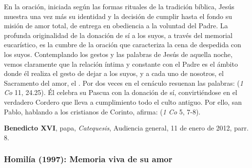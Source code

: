 \begin{patercite}
En la oración, iniciada según las formas rituales de la tradición bíblica, Jesús muestra una vez más su identidad y la decisión de cumplir hasta el fondo su misión de amor total, de entrega en obediencia a la voluntad del Padre. La profunda originalidad de la donación de sí a los suyos, a través del memorial eucarístico, es la cumbre de la oración que caracteriza la cena de despedida con los suyos. Contemplando los gestos y las palabras de Jesús de aquella noche, vemos claramente que la relación íntima y constante con el Padre es el ámbito donde él realiza el gesto de dejar a los suyos, y a cada uno de nosotros, el Sacramento del amor, el . Por dos veces en el cenáculo resuenan las palabras:  (\emph{1 Co} 11, 24.25). Él celebra su Pascua con la donación de sí, convirtiéndose en el verdadero Cordero que lleva a cumplimiento todo el culto antiguo. Por ello, san Pablo, hablando a los cristianos de Corinto, afirma:  (\emph{1 Co} 5, 7-8).

\textbf{Benedicto XVI}, papa, \textit{Catequesis}, Audiencia general, 11 de enero de 2012, parr. 8.
\end{patercite}

\label{b-05-01-1994H}
\newpage
\subsubsection{Homilía (1997): Memoria viva de su amor}


